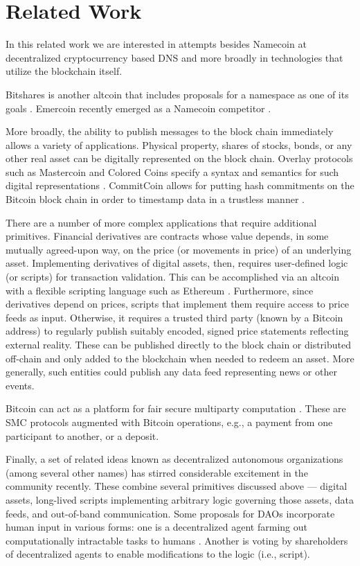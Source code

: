 \section{Related Work}
\label{sec:related}

In this related work we are interested in attempts besides Namecoin at decentralized cryptocurrency based DNS and more broadly in technologies that utilize the blockchain itself.

Bitshares is another altcoin that includes proposals for a namespace as one of its goals \cite{bitsharesdns}. Emercoin recently emerged as a Namecoin competitor \cite{emercoin}. 

More broadly, the ability to publish messages to the block chain immediately allows a variety of applications. Physical property, shares of stocks, bonds, or any other real asset can be digitally represented on the block chain. Overlay protocols such as Mastercoin and Colored Coins specify a syntax and semantics for such digital representations \cite{mastercoinspec, rosenfeld2012overview}. CommitCoin allows for putting hash commitments on the Bitcoin block chain in order to timestamp data in a trustless manner \cite{clark2012commitcoin}.

There are a number of more complex applications that require additional primitives. Financial derivatives are contracts whose value depends, in some mutually agreed-upon way, on the price (or movements in price) of an underlying asset. Implementing derivatives of digital assets, then, requires user-defined logic (or scripts) for transaction validation. This can be accomplished via an altcoin with a flexible scripting language such as Ethereum \cite{ethereumwhitepaper}. Furthermore, since derivatives depend on prices, scripts that implement them require access to price feeds as input. Otherwise, it requires a trusted third party (known by a Bitcoin address) to regularly publish suitably encoded, signed price statements reflecting external reality. These can be published directly to the block chain or distributed off-chain and only added to the blockchain when needed to redeem an asset. More generally, such entities could publish any data feed representing news or other events.

Bitcoin can act as a platform for fair secure multiparty computation \cite{andrychowicz2014secure, bentov2014use, kumaresan2014use}. These are SMC protocols augmented with Bitcoin operations, e.g., a payment from one participant to another, or a deposit.

Finally, a set of related ideas known as decentralized autonomous organizations (among several other names) has stirred considerable excitement in the community recently. These combine several primitives discussed above --- digital assets, long-lived scripts implementing arbitrary logic governing those assets, data feeds, and out-of-band communication. Some proposals for DAOs incorporate human input in various forms: one is a decentralized agent farming out computationally intractable tasks to humans \cite{buterindao}. Another is voting by shareholders of decentralized agents to enable modifications to the logic (i.e., script). 

